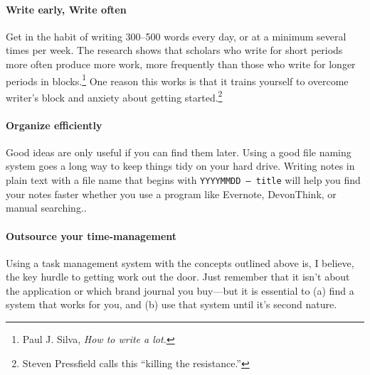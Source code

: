\documentclass{tufte-handout}
\begin{document}
\paragraph{Write early, Write often} Get in the habit of writing 300--500 words every day, or at a minimum several times per week. The research
shows that scholars who write for short periods more often produce
more work, more frequently than those who write for longer periods in
blocks.\footnote{Paul J. Silva, \textit{How to write a lot.}} One
  reason this works is that it trains yourself to overcome writer's
  block and anxiety about getting started.\footnote{Steven
    Pressfield calls this ``killing the resistance.''}

\paragraph{Organize efficiently}

Good ideas are only useful if you can find them later. Using a good file naming system goes a long way to keep things tidy on your hard drive. Writing
notes in plain text with a file name that begins with \texttt{YYYYMMDD
  -- title} will help you find your notes faster whether you use a
program like Evernote, DevonThink, or manual
searching.. 


\paragraph{Outsource your time-management}

Using a task management system with the concepts outlined above is, I
believe, the key hurdle to getting work out the door. Just remember that it isn't about the application or which brand journal you buy---but it is essential to (a) find a system that works for you, and (b) use that system until it's second nature.

\end{document}
